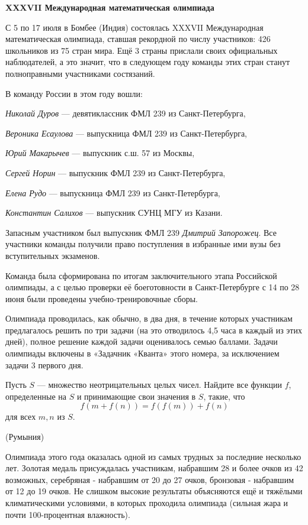 \documentclass[a4paper,9pt]{article}
\begin{document}
\begin{center}
    {\LARGE \textbf{XXXVII Международная математическая олимпиада}}
\end{center}

\begin{multicols}{3}

С 5 по 17 июля в Бомбее (Индия) состоялась XXXVII Международная математическая олимпиада, ставшая рекордной по числу участников: 426 школьников из 75 стран мира. Ещё 3 страны прислали своих официальных наблюдателей, а это значит, что в следующем году команды этих стран станут полноправными участниками состязаний.

В команду России в этом году вошли:

\textit{Николай Дуров} — девятиклассник ФМЛ 239 из Санкт-Петербурга, 

\textit{Вероника Есаулова} — выпускница ФМЛ 239 из Санкт-Петербурга, 

\textit{Юрий Макарычев} — выпускник с.ш. 57 из Москвы,  

\textit{Сергей Норин} — выпускник ФМЛ 239 из Санкт-Петербурга,  

\textit{Елена Рудо} — выпускница ФМЛ 239 из Санкт-Петербурга,  

\textit{Константин Салихов} — выпускник СУНЦ МГУ из Казани.

Запасным участником был выпускник ФМЛ 239 \textit{Дмитрий Запорожец}. Все участники команды получили право поступления в избранные ими вузы без вступительных экзаменов.

Команда была сформирована по итогам заключительного этапа Российской олимпиады, а с целью проверки её боеготовности в Санкт-Петербурге с 14 по 28 июня были проведены учебно-тренировочные сборы.

\columnbreak

Олимпиада проводилась, как обычно, в два дня, в течение которых участникам предлагалось решить по три задачи (на это отводилось 4,5 часа в каждый из этих дней), полное решение каждой задачи оценивалось семью баллами. Задачи олимпиады включены в «Задачник «Кванта» этого номера, за исключением задачи 3 первого дня.
  
Пусть \(S\) — множество неотрицательных целых чисел. Найдите все функции \(f\), определенные на \(S\) и принимающие свои значения в \(S\), такие, что\[f(m + f(n)) = f(f(m)) + f(n)\]
для всех \(m, n\) из \(S\).

\hfill (Румыния)

Олимпиада этого года оказалась одной из самых трудных за последние несколько лет. Золотая медаль присуждалась участникам, набравшим 28 и более очков из 42 возможных, серебряная - набравшим от 20 до 27 очков, бронзовая - набравшим от 12 до 19 очков. Не слишком высокие результаты объясняются ещё и тяжёлыми климатическими условиями, в которых проходила олимпиада (сильная жара и почти 100-процентная влажность).


\end{multicols}
\end{document}
